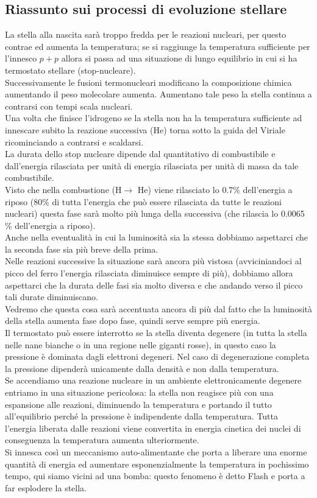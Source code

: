 \subsection{Riassunto sui processi di evoluzione stellare}%
\label{sub:Riassunto sui processi di evoluzione stellare}
La stella alla nascita sarà troppo fredda per le reazioni nucleari, per questo contrae ed aumenta la temperatura; se si raggiunge la temperatura sufficiente per l'innesco $p+p$ allora si passa ad una situazione di lungo equilibrio in cui si ha termostato stellare (stop-nucleare).\\
Successivamente le fusioni termonucleari modificano la composizione chimica aumentando il peso molecolare aumenta. Aumentano tale peso la stella continua a contrarsi con tempi scala nucleari.\\
Una volta che finisce l'idrogeno se la stella non ha la temperatura sufficiente ad innescare subito la reazione successiva (He) torna sotto la guida del Viriale ricominciando a contrarsi e scaldarsi. \\
La durata dello stop nucleare dipende dal quantitativo di combustibile e dall'energia rilasciata per unità di energia rilasciata per unità di massa da tale combustibile.\\
Visto che nella combustione (H$\to $ He) viene rilasciato lo 0.7\% dell'energia a riposo (80\% di tutta l'energia che può essere rilasciata da tutte le reazioni nucleari) questa fase sarà molto più lunga della successiva (che rilascia lo 0.0065 \% dell'energia a riposo). \\
Anche nella eventualità in cui la luminosità sia la stessa dobbiamo aspettarci che la seconda fase sia più breve della prima. \\
Nelle reazioni successive la situazione sarà ancora più vistosa (avviciniandoci al picco del ferro l'energia rilasciata diminuisce sempre di più), dobbiamo allora aspettarci che la durata delle fasi sia molto diversa e che andando verso il picco tali durate diminuiscano.\\
Vedremo che questa cosa sarà accentuata ancora di più dal fatto che la luminosità della stella aumenta fase dopo fase, quindi serve sempre più energia.\\
Il termostato può essere interrotto se la stella diventa degenere (in tutta la stella nelle nane bianche o in una regione nelle giganti rosse), in questo caso la pressione è dominata dagli elettroni degeneri. Nel caso di degenerazione completa la pressione dipenderà unicamente dalla densità e non dalla temperatura. \\
Se accendiamo una reazione nucleare in un ambiente elettronicamente degenere entriamo in una situazione pericolosa: la stella non reagisce più con una espansione alle reazioni, diminuendo la temperatura e portando il tutto all'equilibrio perché la pressione è indipendente dalla temperatura. Tutta l'energia liberata dalle reazioni viene convertita in energia cinetica dei nuclei di conseguenza la temperatura aumenta ulteriormente. \\
Si innesca così un meccanismo auto-alimentante che porta a liberare una enorme quantità di energia ed aumentare esponenzialmente la temperatura in pochissimo tempo, qui siamo vicini ad una bomba: questo fenomeno è detto Flash e porta a far esplodere la stella.
